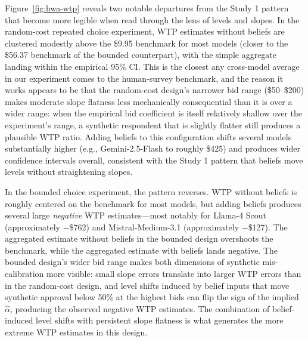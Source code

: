 \documentclass[12pt]{article}
\begin{document}
Figure~\ref{fig:hwa-wtp} reveals two notable departures from the Study
1 pattern that become more legible when read through the lens of levels and slopes. 
In the random-cost repeated choice experiment, WTP estimates without beliefs
are clustered modestly above the \$9.95 benchmark for most
models (closer to the \$56.37 benchmark of the bounded counterpart), with the simple aggregate landing within the empirical 95\% CI.
This is the closest any cross-model average in our experiment comes to
the human-survey benchmark, and the reason it works appears to be that
the random-cost design's narrower bid range (\$50--\$200) makes
moderate slope flatness less mechanically consequential than it is over
a wider range: when the empirical bid coefficient is itself relatively
shallow over the experiment's range, a synthetic respondent that is
slightly flatter still produces a plausible WTP ratio. Adding beliefs
to this configuration shifts several models substantially higher (e.g.,
Gemini-2.5-Flash to roughly \$425) and produces wider
confidence intervals overall, consistent with the Study 1 pattern that
beliefs move levels without straightening slopes.

In the bounded choice experiment, the pattern reverses. WTP without
beliefs is roughly centered on the benchmark for most models, but adding
beliefs produces several large \emph{negative} WTP estimates---most
notably for Llama-4 Scout (approximately $-$\$762) and
Mistral-Medium-3.1 (approximately $-$\$127). The aggregated
estimate without beliefs in the bounded design overshoots the benchmark,
while the aggregated estimate with beliefs lands negative. The bounded
design's wider bid range makes both dimensions of synthetic
mis-calibration more visible: small slope errors translate into larger
WTP errors than in the random-cost design, and level shifts induced by
belief inputs that move synthetic approval below 50\% at the highest
bids can flip the sign of the implied $\hat{\alpha}$, producing the
observed negative WTP estimates. The combination of belief-induced level
shifts with persistent slope flatness is what generates the more extreme
WTP estimates in this design.
\end{document}
